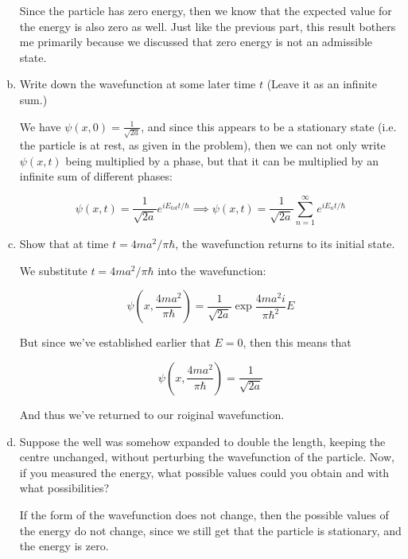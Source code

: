 \documentclass{article}
\begin{document}
\begin{enumerate}[(a)]
    \begin{solution}
        Since the particle has zero energy, then we know that the expected value for the energy is also zero as well. Just like the previous part, this result bothers me primarily because we discussed that zero energy is not an admissible state.
    \end{solution}

    \item Write down the wavefunction at some later time $t$ (Leave it as an infinite sum.)
    
    \begin{solution}
        We have $\psi(x, 0) = \frac{1}{\sqrt{2a}}$, and since this appears to be a stationary state (i.e. the particle is at rest, as given in the problem), then we can not only write $\psi(x, t)$ being multiplied by a phase, but that it can be multiplied by an infinite sum of different phases:

        \[ \psi(x, t) = \frac{1}{\sqrt{2a}} e^{iE_{tot}t/\hbar} \implies \psi(x, t) = \frac{1}{\sqrt{2a}} \sum_{n = 1}^\infty e^{i E_nt/\hbar}\]
    \end{solution}
    \item Show that at time $t = 4ma^2/\pi\hbar$, the wavefunction returns to its initial state.
    
    \begin{solution}
        We substitute $t = 4ma^2/\pi \hbar$ into the wavefunction:

        \[ \psi\left(x, \frac{4ma^2}{\pi \hbar}\right) = \frac{1}{\sqrt{2a}} \exp{\frac{4ma^2i}{\pi \hbar^2} E}\]

        But since we've established earlier that $E = 0$, then this means that 

        \[ \psi\left(x, \frac{4ma^2}{\pi \hbar}\right) = \frac{1}{\sqrt{2a}}\]

        And thus we've returned to our roiginal wavefunction.
    \end{solution}
    \item Suppose the well was somehow expanded to double the length, keeping the centre unchanged, without perturbing the wavefunction of the particle. Now, if you measured the energy, what possible values could you obtain and with what possibilities?
    
    \begin{solution}
        If the form of the wavefunction does not change, then the possible values of the energy do not change, since we still get that the particle is stationary, and the energy is zero.
    \end{solution}
    \end{enumerate}
\end{document}
